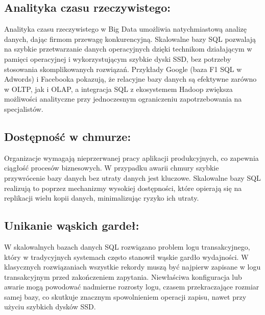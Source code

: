 \documentclass[a4paper,11pt,polish]{sphinxmanual}
\begin{document}
\subsection{Analityka czasu rzeczywistego:}
\label{\detokenize{Wydajnosc-Skalowanie-i-Replikacja/index:analityka-czasu-rzeczywistego}}
\sphinxAtStartPar
Analityka czasu rzeczywistego w Big Data umożliwia natychmiastową analizę danych, dając firmom przewagę konkurencyjną. Skalowalne bazy SQL pozwalają na szybkie przetwarzanie danych operacyjnych dzięki technikom działającym w pamięci operacyjnej i wykorzystującym szybkie dyski SSD, bez potrzeby stosowania skomplikowanych rozwiązań. Przykłady Google (baza F1 SQL w Adwords) i Facebooka pokazują, że relacyjne bazy danych są efektywne zarówno w OLTP, jak i OLAP, a integracja SQL z ekosystemem Hadoop zwiększa możliwości analityczne przy jednoczesnym ograniczeniu zapotrzebowania na specjalistów.


\subsection{Dostępność w chmurze:}
\label{\detokenize{Wydajnosc-Skalowanie-i-Replikacja/index:dostepnosc-w-chmurze}}
\sphinxAtStartPar
Organizacje wymagają nieprzerwanej pracy aplikacji produkcyjnych, co zapewnia ciągłość procesów biznesowych. W przypadku awarii chmury szybkie przywrócenie bazy danych bez utraty danych jest kluczowe. Skalowalne bazy SQL realizują to poprzez mechanizmy wysokiej dostępności, które opierają się na replikacji wielu kopii danych, minimalizując ryzyko ich utraty.


\subsection{Unikanie wąskich gardeł:}
\label{\detokenize{Wydajnosc-Skalowanie-i-Replikacja/index:unikanie-waskich-gardel}}
\sphinxAtStartPar
W skalowalnych bazach danych SQL rozwiązano problem logu transakcyjnego, który w tradycyjnych systemach często stanowił wąskie gardło wydajności. W klasycznych rozwiązaniach wszystkie rekordy muszą być najpierw zapisane w logu transakcyjnym przed zakończeniem zapytania. Niewłaściwa konfiguracja lub awarie mogą powodować nadmierne rozrosty logu, czasem przekraczające rozmiar samej bazy, co skutkuje znacznym spowolnieniem operacji zapisu, nawet przy użyciu szybkich dysków SSD.
\end{document}
